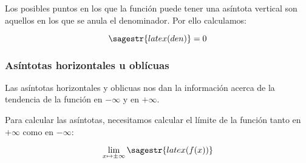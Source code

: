 Los posibles puntos en los que la función puede tener una asíntota vertical son aquellos en los que se anula el denominador. 
%
Por ello calculamos:

\[\sagestr{latex(den)} = 0 \]


\subsubsection{Asíntotas horizontales u oblícuas}

Las asíntotas horizontales y oblicuas nos dan la información acerca de la tendencia de la función en $-\infty$ y en $+\infty$.

Para calcular las asíntotas, necesitamos calcular el límite de la función tanto en $+\infty$ como en $-\infty$:

\[\lim_{x\mapsto \pm\infty} \sagestr{latex(f(x))} \]

